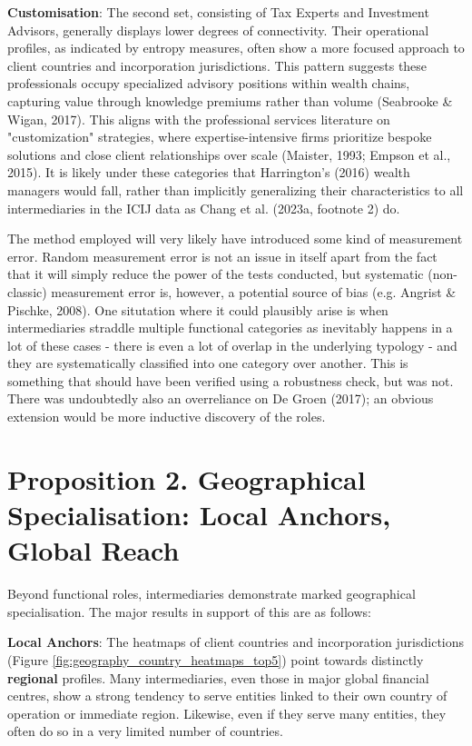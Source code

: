 \textbf{Customisation}: The second set, consisting of Tax Experts and Investment Advisors, generally displays lower degrees of connectivity. Their operational profiles, as indicated by entropy measures, often show a more focused approach to client countries and incorporation jurisdictions. This pattern suggests these professionals occupy specialized advisory positions within wealth chains, capturing value through knowledge premiums rather than volume (Seabrooke \& Wigan, 2017). This aligns with the professional services literature on "customization" strategies, where expertise-intensive firms prioritize bespoke solutions and close client relationships over scale (Maister, 1993; Empson et al., 2015). It is likely under these categories that Harrington's (2016) wealth managers would fall, rather than implicitly generalizing their characteristics to all intermediaries in the ICIJ data as Chang et al. (2023a, footnote 2) do.

The method employed will very likely have introduced some kind of measurement error. Random measurement error is not an issue in itself apart from the fact that it will simply reduce the power of the tests conducted, but systematic (non-classic) measurement error is, however, a potential source of bias (e.g. Angrist \& Pischke, 2008). One situtation where it could plausibly arise is when intermediaries straddle multiple functional categories as inevitably happens in a lot of these cases - there is even a lot of overlap in the underlying typology - and they are systematically classified into one category over another. This is something that should have been verified using a robustness check, but was not. There was undoubtedly also an overreliance on De Groen (2017); an obvious extension would be more inductive discovery of the roles.

\section{Proposition 2. Geographical Specialisation: Local Anchors, Global Reach}
\label{sec:prop2_duality}

Beyond functional roles, intermediaries demonstrate marked geographical specialisation. The major results in support of this are as follows:

\textbf{Local Anchors}: The heatmaps of client countries and incorporation jurisdictions (Figure \ref{fig:geography_country_heatmaps_top5}) point towards distinctly \textbf{regional} profiles. Many intermediaries, even those in major global financial centres, show a strong tendency to serve entities linked to their own country of operation or immediate region. Likewise, even if they serve many entities, they often do so in a very limited number of countries.

